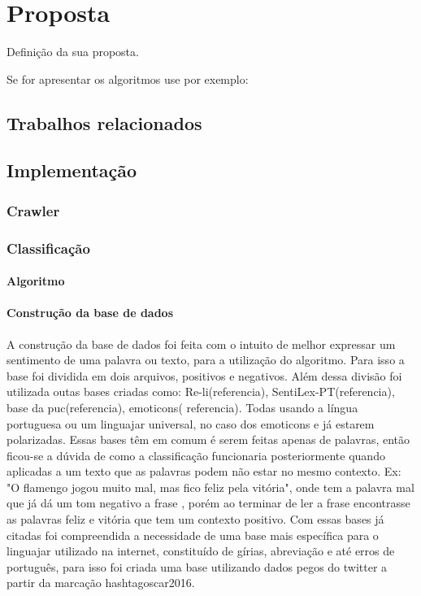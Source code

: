 \chapter{Proposta} \label{cap:proposta}

Definição da sua proposta.

Se for apresentar os algoritmos
use por exemplo:

\section{Trabalhos relacionados}\label{sec:trabalhos_relacionados}

\section{Implementação}\label{sec:implementacao}


\subsection{Crawler}


\subsection{Classificação}


\subsubsection{Algoritmo}


\subsubsection{Construção da base de dados}
A construção da base de dados foi feita com o intuito de melhor expressar um sentimento de uma palavra ou texto, para a utilização do algoritmo. Para isso a base foi dividida em dois arquivos, positivos e negativos. Além dessa divisão foi utilizada outas bases criadas como: Re-li(referencia), SentiLex-PT(referencia), base da puc(referencia), emoticons( referencia). Todas usando a língua portuguesa ou um linguajar universal, no caso dos emoticons e já estarem polarizadas. Essas bases têm em comum é serem feitas apenas de palavras, então ficou-se a dúvida de como a classificação funcionaria posteriormente quando aplicadas a um texto que as palavras podem não estar no mesmo contexto. Ex: "O flamengo jogou muito mal, mas fico feliz pela vitória", onde tem a palavra mal que já dá um tom negativo a frase , porém ao terminar de ler a frase encontrasse as palavras feliz e vitória que tem um contexto positivo.
Com essas bases já citadas foi compreendida a necessidade de uma base mais específica para o linguajar utilizado na internet, constituído de  
gírias, abreviação e até erros de português, para isso foi criada uma base utilizando dados pegos do twitter a partir da marcação hashtagoscar2016.


